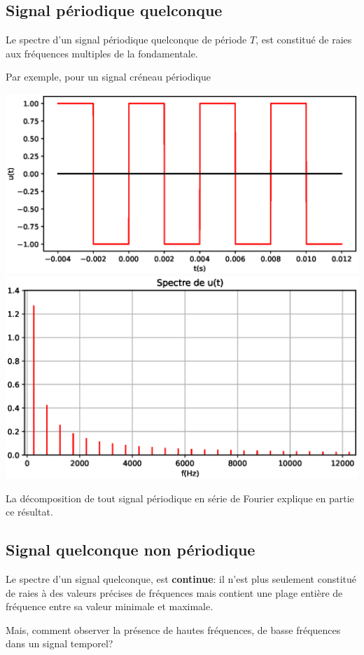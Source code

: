 \documentclass[11pt,a4paper]{article}
\newcounter{exem}
\newcounter{def}
\newcounter{prop}
\newcommand{\defprop}[2][]%
{ 
\addtocounter{prop}{1}
\begin{tcolorbox}[enhanced, arc=1ex,left=3pt,right=3pt,top=3pt,colbacktitle=white,colback=blue!10!white,coltitle=red!70!black, title =Propriété \theprop~#1\black, fonttitle=\sffamily\bfseries\large ]
#2
\end{tcolorbox}
}
\begin{document}
\subsection{Signal périodique quelconque}
\defprop{Le spectre d'un signal périodique quelconque de période $T$, est constitué de raies aux fréquences multiples de la fondamentale. }
Par exemple, pour un signal créneau périodique
\begin{center}
\includegraphics[scale=0.5]{signal_creneau.eps} 
\includegraphics[scale=0.5]{spectre_creneau.eps} 
\end{center}
La décomposition de tout signal périodique en série de Fourier explique en partie ce résultat.
\newpage
\subsection{Signal quelconque non périodique}
Le spectre d'un signal quelconque, est \textbf{continue}: il n'est plus seulement constitué de raies à des valeurs précises de fréquences mais contient une plage entière de fréquence entre sa valeur minimale et maximale.\par
\vspace{4cm}
Mais, comment observer la présence de hautes fréquences, de basse fréquences dans un signal temporel?
\vspace{3cm}
\end{document}

